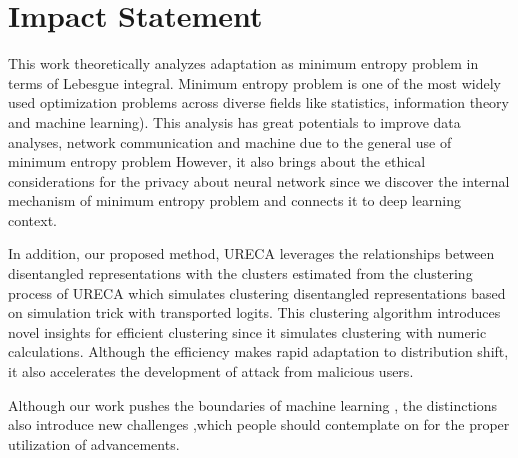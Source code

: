 \section{Impact Statement}

This work theoretically analyzes adaptation as minimum entropy problem in terms of Lebesgue integral. 
Minimum entropy problem is one of the most widely used optimization problems across diverse fields 
like statistics, information theory and machine learning). 
This analysis has great potentials to improve data analyses, network communication and machine 
due to the general use of minimum entropy problem 
However, it also brings about the ethical considerations for the privacy about neural network 
since we discover the internal mechanism of minimum entropy problem and connects it to deep learning context.

In addition, our proposed method, URECA leverages the relationships between disentangled representations 
with the clusters estimated from the clustering process of URECA which simulates clustering disentangled 
representations based on simulation trick with transported logits.
This clustering algorithm introduces novel insights for efficient clustering 
since it simulates clustering with numeric calculations.
Although the efficiency makes rapid adaptation to distribution shift, it also accelerates the development
of attack from malicious users.

Although our work pushes the boundaries of machine learning , the distinctions also introduce new challenges
,which people should contemplate on for the proper utilization of advancements.  

